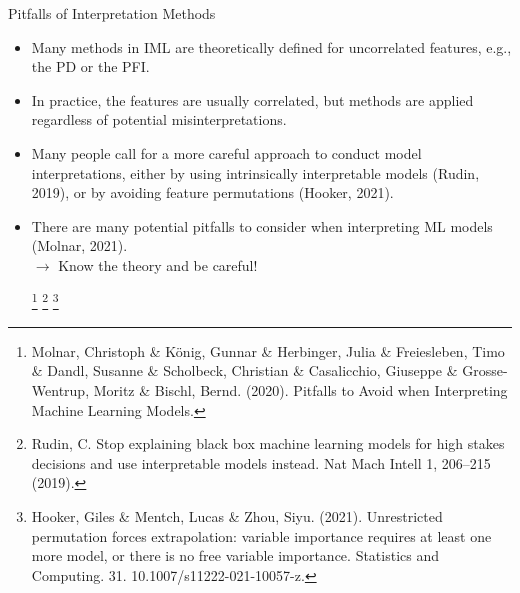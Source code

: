 \documentclass[11pt,compress,t,notes=noshow, aspectratio=169, xcolor=table]{beamer}
\begin{document}
\begin{frame}{Pitfalls of Interpretation Methods}
\begin{itemize}
\item Many methods in IML are theoretically defined for uncorrelated features, e.g., the PD or the PFI.
\item In practice, the features are usually correlated, but methods are applied regardless of potential misinterpretations.
\item Many people call for a more careful approach to conduct model interpretations, either by using intrinsically interpretable models (Rudin, 2019), or by avoiding feature permutations (Hooker, 2021).
\item There are many potential pitfalls to consider when interpreting ML models (Molnar, 2021).
\\
$\rightarrow$ Know the theory and be careful!

\footnote[frame]{Molnar, Christoph \& König, Gunnar \& Herbinger, Julia \& Freiesleben, Timo \& Dandl, Susanne \& Scholbeck, Christian \& Casalicchio, Giuseppe \& Grosse-Wentrup, Moritz \& Bischl, Bernd. (2020). Pitfalls to Avoid when Interpreting Machine Learning Models.}
\footnote[frame]{Rudin, C. Stop explaining black box machine learning models for high stakes decisions and use interpretable models instead. Nat Mach Intell 1, 206–215 (2019).}
\footnote[frame]{Hooker, Giles \& Mentch, Lucas \& Zhou, Siyu. (2021). Unrestricted permutation forces extrapolation: variable importance requires at least one more model, or there is no free variable importance. Statistics and Computing. 31. 10.1007/s11222-021-10057-z.}
\end{itemize}

\end{frame}

\endlecture
\end{document}
